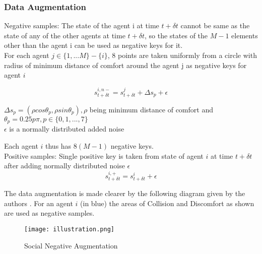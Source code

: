 \subsubsection{Data Augmentation}
Negative samples: The state of the agent i at time $t + {\delta}t$ cannot be same as the state of any of the other agents at time $t + {\delta}t$, so the states of the $M - 1$ elements other than the agent i can be used as negative keys for it. \\
For each agent $j \in \{1,...M\} - \{i\}$, 8 points are taken uniformly from a circle with radius of minimum distance of comfort around the agent j as negative keys for agent $i$


\begin{equation}
s_{t+{\delta}t}^{i,n-} = s_{t+{\delta}t}^{j} + {\Delta}s_p + \epsilon
\end{equation}

${\Delta}s_p = ({\rho}cos{\theta}_p, {\rho}sin{\theta}_p), \rho$ being minimum distance of comfort and ${\theta}_p = 0.25p\pi, p \in \{0, 1,...,7\}$ \\
$\epsilon$ is a normally distributed added noise 


Each agent $i$ thus has $8(M - 1)$ negative keys.\\
Positive samples: Single positive key is taken from state of agent $i$ at time $t + {\delta}t$ after adding normally distributed noise $\epsilon$
\begin{equation}
s_{t+{\delta}t}^{i,+} = s_{t+{\delta}t}^{i} + \epsilon
\end{equation}

The data augmentation is made clearer by the following diagram given by the authors \cite {liu2020snce}. For an agent $i$ (in blue) the areas of Collision and Discomfort as shown are used as negative samples.
\begin{figure}[htp]
    \centering
    \texttt{[image: illustration.png]}
    \caption{Social Negative Augmentation}
    \label{fig:Social Negative Augmentation}
\end{figure}

